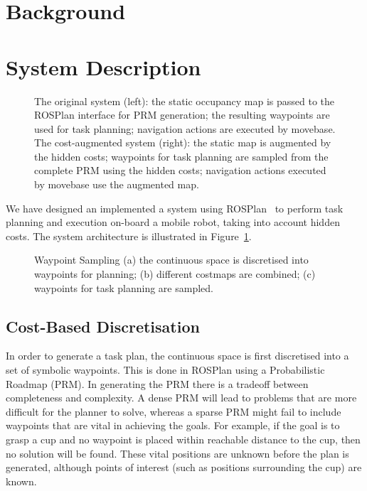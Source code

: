 \documentclass[letterpaper]{article}
\begin{document}
\section{Background}



\section{System Description}

\begin{figure}[!th]
    \centering
    
    \caption{The original system (left): the static occupancy map is passed to the ROSPlan interface for PRM generation; the resulting waypoints are used for task planning; navigation actions are executed by movebase. The cost-augmented system (right): the static map is augmented by the hidden costs; waypoints for task planning are sampled from the complete PRM using the hidden costs; navigation actions executed by movebase use the augmented map.}
    \label{fig:arch}
\end{figure}

We have designed an implemented a system using ROSPlan~\cite{Cashmore2015a} to perform task planning and execution on-board a mobile robot, taking into account hidden costs. The system architecture is illustrated in Figure~\ref{fig:arch}.

\begin{figure}[!th]
    \centering
    
    \caption{Waypoint Sampling (a) the continuous space is discretised into waypoints for planning; (b) different costmaps are combined; (c) waypoints for task planning are sampled.}
    \label{fig:sampling}
\end{figure}

\subsection{Cost-Based Discretisation}

In order to generate a task plan, the continuous space is first discretised into a set of symbolic waypoints. This is done in ROSPlan using a Probabilistic Roadmap (PRM). In generating the PRM there is a tradeoff between completeness and complexity. A dense PRM will lead to problems that are more difficult for the planner to solve, whereas a sparse PRM might fail to include waypoints that are vital in achieving the goals. For example, if the goal is to grasp a cup and no waypoint is placed within reachable distance to the cup, then no solution will be found.
%
These vital positions are unknown before the plan is generated, although points of interest (such as positions surrounding the cup) are known.
\end{document}
